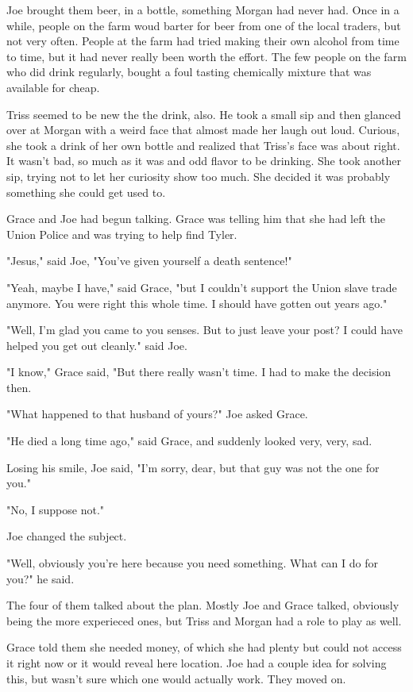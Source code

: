 \documentclass[courier]{sffms}
\begin{document}
Joe brought them beer, in a bottle, something Morgan
had never had. Once in a while, people on the farm
woud barter for beer from one of the local traders, but
not very often. People at the farm had tried making
their own alcohol from time to time, but it had never
really been worth the effort. The few people on the farm
who did drink regularly, bought a foul tasting chemically
mixture that was available for cheap.

Triss seemed to be new the the drink, also. He took a
small sip and then glanced over at Morgan with a weird
face that almost made her laugh out loud. Curious, she
took a drink of her own bottle and realized that Triss's
face was about right. It wasn't bad, so much as it was
and odd flavor to be drinking. She took another sip, trying
not to let her curiosity show too much. She decided it
was probably something she could get used to.

Grace and Joe had begun talking. Grace was telling him
that she had left the Union Police and was trying to help
find Tyler.

"Jesus," said Joe, "You've given yourself a death sentence!"

"Yeah, maybe I have," said Grace, "but I couldn't support
the Union slave trade anymore. You were right this whole
time. I should have gotten out years ago."

"Well, I'm glad you came to you senses. But to just leave
your post? I could have helped you get out cleanly." said Joe.

"I know," Grace said, "But there really wasn't time. I had to
make the decision then.

"What happened to that husband of yours?" Joe asked Grace.

"He died a long time ago," said Grace, and suddenly looked
very, very, sad.

Losing his smile, Joe said, "I'm sorry, dear, but that guy was
not the one for you."

"No, I suppose not."

Joe changed the subject.

"Well, obviously you're here because you need something.
What can I do for you?" he said.

The four of them talked about the plan. Mostly Joe
and Grace talked, obviously being the more experieced
ones, but Triss and Morgan had a role to play as well.

Grace told them she needed money, of which she had
plenty but could not access it right now or it would
reveal here location. Joe had a couple idea for solving
this, but wasn't sure which one would actually work.
They moved on.
\end{document}
